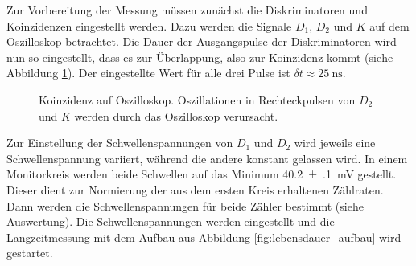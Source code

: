 Zur Vorbereitung der Messung müssen zunächst die Diskriminatoren und Koinzidenzen eingestellt werden. Dazu werden die Signale $D_1$, $D_2$ und $K$ auf dem Oszilloskop betrachtet. Die Dauer der Ausgangspulse der Diskriminatoren wird nun so eingestellt, dass es zur Überlappung, also zur Koinzidenz kommt (siehe Abbildung \ref{fig:signal_oszi}). Der eingestellte Wert für alle drei Pulse ist $\delta t \approx \SI{25}{\nano\second}$.

\begin{figure}[h]
  \centering
  \caption{Koinzidenz auf Oszilloskop. Oszillationen in Rechteckpulsen von $D_2$ und $K$ werden durch das Oszilloskop verursacht.}
  \label{fig:signal_oszi}
\end{figure}

Zur Einstellung der Schwellenspannungen von $D_1$ und $D_2$ wird jeweils eine Schwellenspannung variiert, während die andere konstant gelassen wird. In einem Monitorkreis werden beide Schwellen auf das Minimum \SI[separate-uncertainty = true]{40.2(1)}{\milli\volt} gestellt. Dieser dient zur Normierung der aus dem ersten Kreis erhaltenen Zählraten. Dann werden die Schwellenspannungen für beide Zähler bestimmt (siehe Auswertung). Die Schwellenspannungen werden eingestellt und die Langzeitmessung mit dem Aufbau aus Abbildung \ref{fig:lebensdauer_aufbau} wird gestartet.
